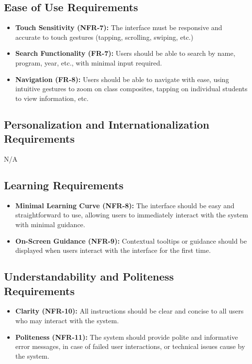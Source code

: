 \documentclass[12pt]{article}
\begin{document}
\subsection{Ease of Use Requirements}
\begin{itemize}
    \item \textbf{Touch Sensitivity (NFR-7):} The interface must be responsive and accurate to touch gestures (tapping, scrolling, swiping, etc.)
    \item \textbf{Search Functionality (FR-7):} Users should be able to search by name, program, year, etc., with minimal input required.
    \item \textbf{Navigation (FR-8):} Users should be able to navigate with ease, using intuitive gestures to zoom on class composites, tapping on individual students to view information, etc.
\end{itemize}

\subsection{Personalization and Internationalization Requirements}
N/A

\subsection{Learning Requirements}
\begin{itemize}
    \item \textbf{Minimal Learning Curve (NFR-8):} The interface should be easy and straightforward to use, allowing users to immediately interact with the system with minimal guidance.
    \item \textbf{On-Screen Guidance (NFR-9):} Contextual tooltips or guidance should be displayed when users interact with the interface for the first time.
\end{itemize}

\subsection{Understandability and Politeness Requirements}
\begin{itemize}
    \item \textbf{Clarity (NFR-10):} All instructions should be clear and concise to all users who may interact with the system.
    \item \textbf{Politeness (NFR-11):} The system should provide polite and informative error messages, in case of failed user interactions, or technical issues cause by the system.
\end{itemize}
\end{document}
